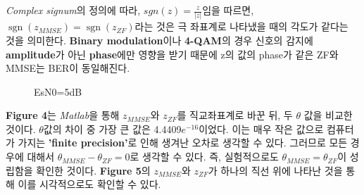 \documentclass{article}
\newcommand{\bd}{\textbf} %
\providecommand{\abs}[1]{\lvert#1\rvert}
\newcommand{\sgn}{\operatorname{sgn}}
\begin{document}
\textsl{Complex signum}의 정의에 따라, $sgn(z)=\frac{z}{\abs{z}}$임을 따르면, $\sgn(z_{MMSE})=\sgn(z_{ZF})$라는 것은 극 좌표계로 나타냈을 때의 각도가 같다는 것을 의미한다. \bd{Binary modulation}이나 \bd{4-QAM}의 경우 신호의 감지에 \bd{amplitude}가 아닌 \bd{phase}에만 영향을 받기 때문에 z의 값의 phase가 같은 ZF와 MMSE는 BER이 동일해진다.\\
\begin{figure}[H]
	\centering
	\caption{EsN0=5dB}
\end{figure}
\bd{Figure 4}는 \textsl{Matlab}을 통해 $z_{MMSE}$와 $z_{ZF}$를 직교좌표계로 바꾼 뒤, 두 $\theta$ 값을 비교한 것이다. $\theta$값의 차이 중 가장 큰 값은 4.4409$e^{-16}$이었다. 이는 매우 작은 값으로 컴퓨터가 가지는 \bd{'finite precision'}로 인해 생겨난 오차로 생각할 수 있다. 그러므로 모든 경우에 대해서 $\theta_{MMSE}-\theta_{ZF}=0$로 생각할 수 있다. 즉, 실험적으로도 $\theta_{MMSE}=\theta_{ZF}$이 성립함을 확인한 것이다. \bd{Figure 5}의 $z_{MMSE}$와 $z_{ZF}$가 하나의 직선 위에 나타난 것을 통해 이를 시각적으로도 확인할 수 있다.
\end{document}
